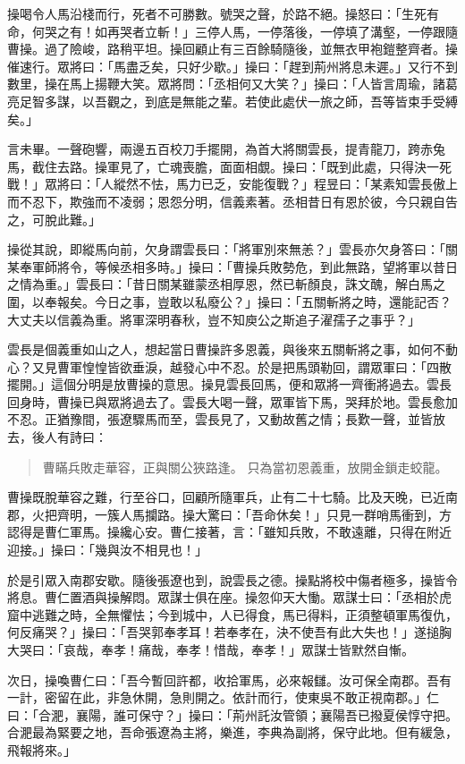 操喝令人馬沿棧而行，死者不可勝數。號哭之聲，於路不絕。操怒曰：「生死有命，何哭之有！如再哭者立斬！」三停人馬，一停落後，一停填了溝壑，一停跟隨曹操。過了險峻，路稍平坦。操回顧止有三百餘騎隨後，並無衣甲袍鎧整齊者。操催速行。眾將曰：「馬盡乏矣，只好少歇。」操曰：「趕到荊州將息未遲。」又行不到數里，操在馬上揚鞭大笑。眾將問：「丞相何又大笑？」操曰：「人皆言周瑜，諸葛亮足智多謀，以吾觀之，到底是無能之輩。若使此處伏一旅之師，吾等皆束手受縛矣。」

言未畢。一聲砲響，兩邊五百校刀手擺開，為首大將關雲長，提青龍刀，跨赤兔馬，截住去路。操軍見了，亡魂喪膽，面面相覷。操曰：「既到此處，只得決一死戰！」眾將曰：「人縱然不怯，馬力已乏，安能復戰？」程昱曰：「某素知雲長傲上而不忍下，欺強而不凌弱；恩怨分明，信義素著。丞相昔日有恩於彼，今只親自告之，可脫此難。」

操從其說，即縱馬向前，欠身謂雲長曰：「將軍別來無恙？」雲長亦欠身答曰：「關某奉軍師將令，等候丞相多時。」操曰：「曹操兵敗勢危，到此無路，望將軍以昔日之情為重。」雲長曰：「昔日關某雖蒙丞相厚恩，然已斬顏良，誅文醜，解白馬之圍，以奉報矣。今日之事，豈敢以私廢公？」操曰：「五關斬將之時，還能記否？大丈夫以信義為重。將軍深明春秋，豈不知庾公之斯追子濯孺子之事乎？」

雲長是個義重如山之人，想起當日曹操許多恩義，與後來五關斬將之事，如何不動心？又見曹軍惶惶皆欲垂淚，越發心中不忍。於是把馬頭勒回，謂眾軍曰：「四散擺開。」這個分明是放曹操的意思。操見雲長回馬，便和眾將一齊衝將過去。雲長回身時，曹操已與眾將過去了。雲長大喝一聲，眾軍皆下馬，哭拜於地。雲長愈加不忍。正猶豫間，張遼驟馬而至，雲長見了，又動故舊之情；長歎一聲，並皆放去，後人有詩曰：

\begin{quote}
曹瞞兵敗走華容，正與關公狹路逢。
只為當初恩義重，放開金鎖走蛟龍。
\end{quote}

曹操既脫華容之難，行至谷口，回顧所隨軍兵，止有二十七騎。比及天晚，已近南郡，火把齊明，一簇人馬攔路。操大驚曰：「吾命休矣！」只見一群哨馬衝到，方認得是曹仁軍馬。操纔心安。曹仁接著，言：「雖知兵敗，不敢遠離，只得在附近迎接。」操曰：「幾與汝不相見也！」

於是引眾入南郡安歇。隨後張遼也到，說雲長之德。操點將校中傷者極多，操皆令將息。曹仁置酒與操解悶。眾謀士俱在座。操忽仰天大慟。眾謀士曰：「丞相於虎窟中逃難之時，全無懼怯；今到城中，人已得食，馬已得料，正須整頓軍馬復仇，何反痛哭？」操曰：「吾哭郭奉孝耳！若奉孝在，決不使吾有此大失也！」遂搥胸大哭曰：「哀哉，奉孝！痛哉，奉孝！惜哉，奉孝！」眾謀士皆默然自慚。

次日，操喚曹仁曰：「吾今暫回許都，收拾軍馬，必來報讎。汝可保全南郡。吾有一計，密留在此，非急休開，急則開之。依計而行，使東吳不敢正視南郡。」仁曰：「合淝，襄陽，誰可保守？」操曰：「荊州託汝管領；襄陽吾已撥夏侯惇守把。合淝最為緊要之地，吾命張遼為主將，樂進，李典為副將，保守此地。但有緩急，飛報將來。」


